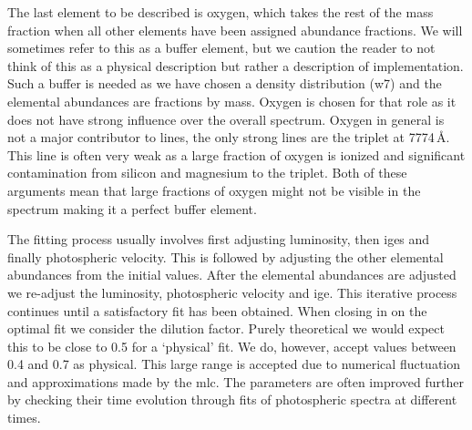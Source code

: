 The last element to be described is oxygen, which takes the rest of the mass fraction when all other elements have been assigned abundance fractions. We will sometimes refer to this as a buffer element, but we caution the reader to not think of this as a physical description but rather a description of implementation. Such a buffer is needed as we have chosen a density distribution (\gls{w7}) and the elemental abundances are fractions by mass. Oxygen is chosen for that role as it does not have strong influence over the overall spectrum. Oxygen in general is not a major contributor to lines, the only strong lines are the  triplet at 7774\,\AA. This line is often very weak as a large fraction of oxygen is ionized and significant contamination from silicon and magnesium to the triplet. Both of these arguments mean that large fractions of oxygen might not be visible in the spectrum making it a perfect buffer element. 


The fitting process usually involves first adjusting luminosity, then \glspl{ige} and finally photospheric velocity. This is followed by adjusting the other elemental abundances from the initial values. After the elemental abundances are adjusted we re-adjust the luminosity, photospheric velocity and \gls{ige}. This iterative process continues until a satisfactory fit has been obtained. When closing in on the optimal fit we consider the dilution factor. Purely theoretical we would expect this to be close to 0.5 for a `physical' fit. We do, however, accept values between 0.4 and 0.7 as physical. This large range is accepted due to numerical fluctuation and approximations made by the \gls{mlc}. The parameters are often improved further by checking their time evolution through fits of photospheric spectra at different times.






